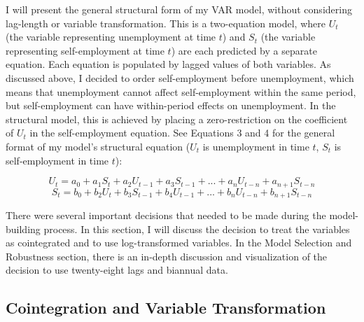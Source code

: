 \documentclass[]{ecca}
\begin{document}
I will present the general structural form of my VAR model, without considering lag-length or variable transformation. This is a two-equation model, where $U_t$ (the variable representing unemployment at time $t$) and $S_t$ (the variable representing self-employment at time $t$) are each predicted by a separate equation. Each equation is populated by lagged values of both variables. As discussed above, I decided to order self-employment before unemployment, which means that unemployment cannot affect self-employment within the same period, but self-employment can have within-period effects on unemployment. In the structural model, this is achieved by placing a zero-restriction on the coefficient of $U_t$ in the self-employment equation. See Equations 3 and 4 for the general format of my model's structural equation ($U_t$ is unemployment in time $t$, $S_t$ is self-employment in time $t$):

\begin{equation}
U_t = a_0 + a_1S_t + a_2U_{t-1} + a_3S_{t-1} + ... + a_nU_{t-n} + a_{n+1}S_{t-n}
\end{equation}
\begin{equation}
S_t = b_0 + b_2U_t + b_3S_{t-1} + b_4U_{t-1} + ... + b_nU_{t-n} + b_{n+1}S_{t-n}
\end{equation}

There were several important decisions that needed to be made during the model-building process. In this section, I will discuss the decision to treat the variables as cointegrated and to use log-transformed variables. In the Model Selection and Robustness section, there is an in-depth discussion and visualization of the decision to use twenty-eight lags and biannual data.

\subsection{Cointegration and Variable Transformation}
\end{document}
